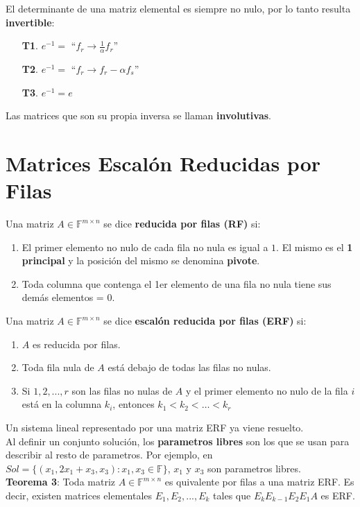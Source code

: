 \documentclass[11pt,a4paper]{article}
\begin{document}
El determinante de una matriz elemental es siempre no nulo, por lo tanto resulta \textbf{invertible}:
\begin{itemize}
\itemsep-0.3em
\item[\textbf{T1}.] $e^{-1} =$ ``$f_r \rightarrow \frac{1}{\alpha} f_r$''
\item[\textbf{T2}.] $e^{-1} =$ ``$f_r \rightarrow f_r - \alpha f_s$''
\item[\textbf{T3}.] $e^{-1} = e$
\end{itemize}

Las matrices que son su propia inversa se llaman \textbf{involutivas}.

\section{Matrices Escal\'on Reducidas por Filas}
Una matriz $A \in \mathbb{F}^{m \times n}$ se dice \textbf{reducida por filas (RF)} si:
\begin{enumerate}
\itemsep-0.3em
\item El primer elemento no nulo de cada fila no nula es igual a $1$. El mismo es el \textbf{1 principal} y la posici\'on del mismo se denomina \textbf{pivote}.
\item Toda columna que contenga el 1er elemento de una fila no nula tiene sus dem\'as elementos = 0.
\end{enumerate}
Una matriz $A \in \mathbb{F}^{m \times n}$ se dice \textbf{escal\'on reducida por filas (ERF)} si:
\begin{enumerate}
\itemsep-0.3em
\item $A$ es reducida por filas.
\item Toda fila nula de $A$ est\'a debajo de todas las filas no nulas.
\item Si $1,2,...,r$ son las filas no nulas de $A$ y el primer elemento no nulo de la fila $i$ est\'a en la columna $k_i$, entonces $k_1 < k_2 < \hdots < k_r$
\end{enumerate}
Un sistema lineal representado por una matriz ERF ya viene resuelto.\\

Al definir un conjunto soluci\'on, los \textbf{parametros libres} son los que se usan para describir al resto de parametros. Por ejemplo, en $Sol = \{ (x_1, 2 x_1 + x_3, x_3) : x_1, x_3 \in \mathbb{F}\}$, $x_1$ y $x_3$ son parametros libres.\\

\textbf{Teorema 3}: Toda matriz $A \in \mathbb{F}^{m \times n}$ es quivalente por filas a una matriz ERF. Es decir, existen matrices elementales $E_1, E_2, ..., E_k$ tales que $E_kE_{k-1}E_2E_1A$ es ERF.\\
\end{document}
